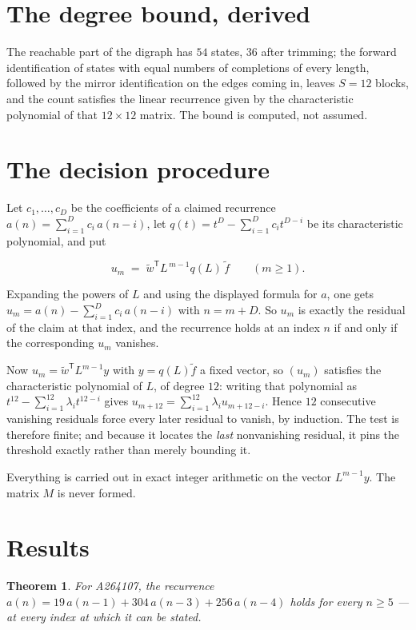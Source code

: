\documentclass[11pt]{article}
\newtheorem{theorem}{Theorem}
\theoremstyle{definition}
\begin{document}
\section{The degree bound, derived}

The reachable part of the digraph has $54$ states, $36$ after trimming; the forward identification of states with equal numbers of completions of every length, followed by the mirror identification on the edges coming in, leaves $S = 12$ blocks, and the count satisfies the linear recurrence given by the characteristic polynomial of that $12\times12$ matrix. The bound is computed, not assumed.

\section{The decision procedure}

Let $c_1,\dots,c_D$ be the coefficients of a claimed recurrence $a(n) = \sum_{i=1}^{D} c_i\,a(n-i)$, let $q(t) = t^{D} - \sum_{i=1}^{D} c_i t^{D-i}$ be its characteristic polynomial, and put

\[u_m \;=\; \tilde w^{\mathsf T} L^{\,m-1} q(L)\,\tilde f \qquad (m \ge 1).\]

Expanding the powers of $L$ and using the displayed formula for $a$, one gets $u_m = a(n) - \sum_{i=1}^{D} c_i\,a(n-i)$ with $n = m + D$. So $u_m$ is exactly the residual of the claim at that index, and the recurrence holds at an index $n$ if and only if the corresponding $u_m$ vanishes.

Now $u_m = \tilde w^{\mathsf T} L^{m-1} y$ with $y = q(L)\tilde f$ a fixed vector, so $(u_m)$ satisfies the characteristic polynomial of $L$, of degree $12$: writing that polynomial as $t^{12} - \sum_{i=1}^{12} \lambda_i t^{12-i}$ gives $u_{m+12} = \sum_{i=1}^{12} \lambda_i u_{m+12-i}$. Hence $12$ consecutive vanishing residuals force every later residual to vanish, by induction. The test is therefore finite; and because it locates the {\itshape last} nonvanishing residual, it pins the threshold exactly rather than merely bounding it.

Everything is carried out in exact integer arithmetic on the vector $L^{m-1}y$. The matrix $M$ is never formed.

\section{Results}

\begin{theorem} For A264107, the recurrence $a(n) = 19\,a(n-1) + 304\,a(n-3) + 256\,a(n-4)$ holds for every $n \ge 5$ --- at every index at which it can be stated.\end{theorem}
\end{document}

